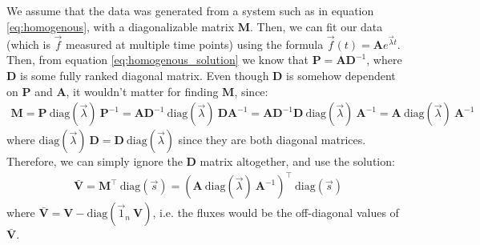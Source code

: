 \documentclass{article}
\begin{document}
We assume that the data was generated from a system such as in equation \ref{eq:homogenous}, with a diagonalizable matrix $\mathbf{M}$. Then, we can fit our data (which is $\vec{f}$ measured at multiple time points) using the formula $\vec{f}(t) = \mathbf{A} e^{\vec{\lambda} t}$. Then, from equation \ref{eq:homogenous_solution} we know that $\mathbf{P} = \mathbf{A} \mathbf{D}^{-1}$, where $\mathbf{D}$ is some fully ranked diagonal matrix. Even though $\mathbf{D}$ is somehow dependent on $\mathbf{P}$ and $\mathbf{A}$, it wouldn't matter for finding $\mathbf{M}$, since:
\begin{eqnarray}
    \mathbf{M} = \mathbf{P}~\text{diag}(\vec{\lambda})~\mathbf{P}^{-1} = \mathbf{A}\mathbf{D}^{-1}~\text{diag}(\vec{\lambda})~\mathbf{D}\mathbf{A}^{-1} = 
    \mathbf{A}\mathbf{D}^{-1}\mathbf{D}~\text{diag}(\vec{\lambda})~\mathbf{A}^{-1} = 
    \mathbf{A}~\text{diag}(\vec{\lambda})~\mathbf{A}^{-1}
\end{eqnarray}
where $\text{diag}(\vec{\lambda})~\mathbf{D} = \mathbf{D}~\text{diag}(\vec{\lambda})$ since they are both diagonal matrices. Therefore, we can simply ignore the $\mathbf{D}$ matrix altogether, and use the solution:
\begin{eqnarray}
    \mathbf{\bar{V}} = \mathbf{M}^\top~\text{diag}(\vec{s}) = \left(\mathbf{A}~\text{diag}(\vec{\lambda})~\mathbf{A}^{-1} \right)^\top~\text{diag}(\vec{s})
\end{eqnarray}
where $\mathbf{\bar{V}} = \mathbf{V} - \text{diag}(\vec{1}_n~\mathbf{V})$, i.e. the fluxes would be the off-diagonal values of $\mathbf{\bar{V}}$.
\end{document}

